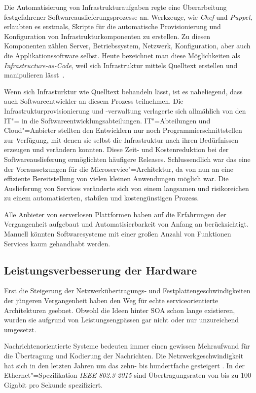 Die Automatisierung von Infrastrukturaufgaben regte eine Überarbeitung festgefahrener Softwareauslieferungsprozesse an. Werkzeuge, wie \textit{Chef} und \textit{Puppet}, erlaubten es erstmals, Skripte für die automatische Provisionierung und Konfiguration von Infrastrukturkomponenten zu erstellen. Zu diesen Komponenten zählen Server, Betriebssystem, Netzwerk, Konfiguration, aber auch die Applikationssoftware selbst. Heute bezeichnet man diese Möglichkeiten als \textit{Infrastructure-as-Code}, weil sich Infrastruktur mittels Quelltext erstellen und manipulieren lässt~\cite[135]{Httermann:2012:DD:2380958}.

Wenn sich Infrasturktur wie Quelltext behandeln lässt, ist es naheliegend, dass auch Softwareentwickler an diesem Prozess teilnehmen. Die Infrastrukturprovisionierung und -verwaltung verlagerte sich allmählich von den IT"= in die Softwareentwicklungsabteilungen. IT"=Abteilungen und Cloud"=Anbieter stellten den Entwicklern nur noch Programmierschnittstellen zur Verfügung, mit denen sie selbst die Infrastruktur nach ihren Bedürfnissen erzeugen und verändern konnten. Diese Zeit- und Kostenreduktion bei der Softwareauslieferung ermöglichten häufigere Releases. Schlussendlich war das eine der Voraussetzungen für die Microservice"=Architektur, da von nun an eine effiziente Bereitstellung von vielen kleinen Anwendungen möglich war. Die Auslieferung von Services veränderte sich von einem langsamen und risikoreichen zu einem automatisierten, stabilen und kostengünstigen Prozess.

Alle Anbieter von serverlosen Plattformen haben auf die Erfahrungen der Vergangenheit aufgebaut und Automatisierbarkeit von Anfang an berücksichtigt. Manuell könnten Softwaresysteme mit einer großen Anzahl von Funktionen \bzw Services kaum gehandhabt werden. 

\subsection{Leistungsverbesserung der Hardware}

Erst die Steigerung der Netzwerkübertragungs- und Festplattengeschwindigkeiten der jüngeren Vergangenheit haben den Weg für echte serviceorientierte Architekturen geebnet. Obwohl die Ideen hinter SOA schon lange existieren, wurden sie aufgrund von Leistungsengpässen gar nicht oder nur unzureichend umgesetzt.

Nachrichtenorientierte Systeme bedeuten immer einen gewissen Mehraufwand für die Übertragung und Kodierung der Nachrichten. Die Netzwerkgeschwindigkeit hat sich in den letzten Jahren um das zehn- bis hundertfache gesteigert \cite{IEEEBandwidth}. In der Ethernet"=Spezifikation \textit{IEEE 802.3-2015} sind Übertragungsraten von bis zu 100 Gigabit pro Sekunde spezifiziert.

